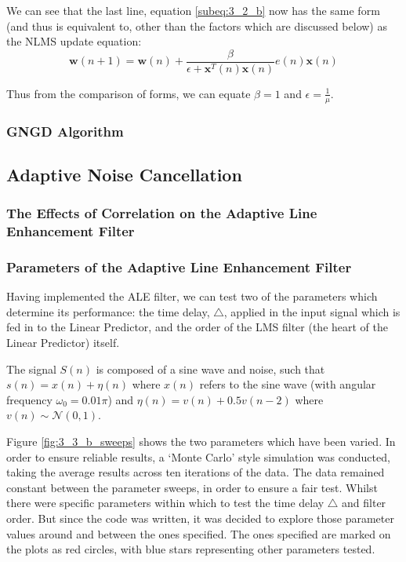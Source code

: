 \documentclass[./main.tex]{subfiles}
\begin{document}
We can see that the last line, equation \ref{subeq:3_2_b} now has the same form (and thus is equivalent to, other than the factors which are discussed below) as the NLMS update equation:
$$ \mathbf{w}(n+1) = \mathbf{w}(n) + \frac{\beta}{\epsilon + \mathbf{x}^T(n)\mathbf{x}(n)} e(n) \mathbf{x}(n) $$

Thus from the comparison of forms, we can equate $ \beta = 1 $ and $ \epsilon = \frac{1}{\mu} $.

\subsubsection{GNGD Algorithm}


\subsection{Adaptive Noise Cancellation}


\subsubsection{The Effects of Correlation on the Adaptive Line Enhancement Filter} \label{sec:3_3_a}


\subsubsection{Parameters of the Adaptive Line Enhancement Filter}
Having implemented the ALE filter, we can test two of the parameters which determine its performance: the time delay, $ \bigtriangleup $, applied in the input signal which is fed in to the Linear Predictor, and the order of the LMS filter (the heart of the Linear Predictor) itself.

The signal $S(n)$ is composed of a sine wave and noise, such that $ s(n) = x(n) + \eta(n) $ where $x(n)$ refers to the sine wave (with angular frequency $ \omega_0 = 0.01\pi$) and $ \eta(n) = v(n) + 0.5v(n-2) $ where $v(n) \sim \mathcal{N}(0,1) $.

Figure \ref{fig:3_3_b_sweeps} shows the two parameters which have been varied. In order to ensure reliable results, a `Monte Carlo' style simulation was conducted, taking the average results across ten iterations of the data. The data remained constant between the parameter sweeps, in order to ensure a fair test. Whilst there were specific parameters within which to test the time delay $ \bigtriangleup $ and filter order. But since the code was written, it was decided to explore those parameter values around and between the ones specified. The ones specified are marked on the plots as red circles, with blue stars representing other parameters tested.
\end{document}
